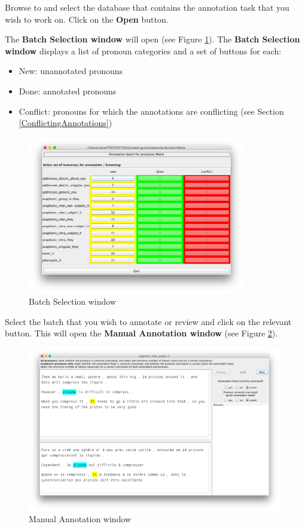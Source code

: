 \documentclass[11pt]{article} %
\begin{document}
Browse to and select the database that contains the annotation task that you wish to work on. Click on the \textbf{Open} button.

The \textbf{Batch Selection window} will open (see Figure \ref{fig:BatchWindow}). The \textbf{Batch Selection window} displays a list of pronoun categories and a set of buttons for each:

\begin{itemize}
  \item New: unannotated pronouns
  \item Done: annotated pronouns
  \item Conflict: pronouns for which the annotations are conflicting (see Section \ref{ConflictingAnnotations})
\end{itemize}

\begin{figure}[h!]
    \centering
    \includegraphics[width=0.85\textwidth]{BatchSelectionWindow.png}
    \caption{Batch Selection window}
    \label{fig:BatchWindow}
\end{figure}

Select the batch that you wish to annotate or review and click on the relevant button. This will open the \textbf{Manual Annotation window} (see Figure \ref{fig:AnnotationWindow}).

\begin{figure}[h!]
    \centering
    \includegraphics[width=0.99\textwidth]{ManualAnnotationWindow.png}
    \caption{Manual Annotation window}
    \label{fig:AnnotationWindow}
\end{figure}
\end{document}

